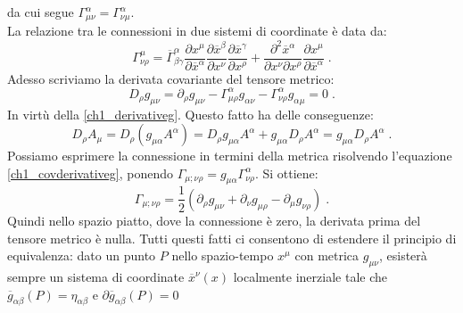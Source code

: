 \documentclass[12pt,a4paper]{report}
\theoremstyle{definition}
\begin{document}
da cui segue $\Gamma^{\alpha}_{\mu\nu}=\Gamma^{\alpha}_{\nu\mu}$. \\
La relazione tra le connessioni in due sistemi di coordinate è data da:
\begin{equation}
\Gamma^{\mu}_{\nu\rho}=\overline{\Gamma}^{\alpha}_{\beta\gamma}\frac{\partial x^{\mu}}{\partial\overline{x}^{\alpha}}\frac{\partial\overline{x}^{\beta}}{\partial x^{\nu}}\frac{\partial \overline{x}^{\gamma}}{\partial x^{\rho}}+\frac{\partial^2\overline{x}^{\alpha}}{\partial x^{\nu}\partial x^{\rho}}\frac{\partial x^{\mu}}{\partial \overline{x}^{\alpha}}\;.
\end{equation}
Adesso scriviamo la derivata covariante del tensore metrico:
\begin{equation}
D_{\rho}g_{\mu\nu}=\partial_{\rho}g_{\mu\nu}-\Gamma^{\alpha}_{\mu\rho}g_{\alpha\nu}-\Gamma^{\alpha}_{\nu\rho}g_{\alpha\mu}=0\;. \label{ch1_covderivativeg}
\end{equation}
In virtù della \eqref{ch1_derivativeg}. Questo fatto ha delle conseguenze:
$$
D_{\rho}A_{\mu}=D_{\rho}(g_{\mu\alpha}A^{\alpha})=D_{\rho}g_{\mu\alpha}A^{\alpha}+g_{\mu\alpha}D_{\rho}A^{\alpha}=g_{\mu\alpha}D_{\rho}A^{\alpha}\;.
$$
Possiamo esprimere la connessione in termini della metrica risolvendo l'equazione \eqref{ch1_covderivativeg}, ponendo $\Gamma_{\mu;\nu\rho}=g_{\mu\alpha}\Gamma^{\alpha}_{\nu\rho}$. Si ottiene:
\begin{equation}
\Gamma_{\mu;\nu\rho}=\frac{1}{2}(\partial_{\rho}g_{\mu\nu}+\partial_{\nu}g_{\mu\rho}-\partial_{\mu}g_{\nu\rho})\;.
\end{equation}
Quindi nello spazio piatto, dove la connessione è zero, la derivata prima del tensore metrico è nulla. Tutti questi fatti ci consentono di estendere il principio di equivalenza: dato un punto $P$ nello spazio-tempo $x^{\mu}$ con metrica $g_{\mu\nu}$, esisterà sempre un sistema di coordinate $\overline{x}^{\nu}(x)$ localmente inerziale tale che $\overline{g}_{\alpha\beta}(P)=\eta_{\alpha\beta}$ e $\partial \overline{g}_{\alpha\beta}(P)=0$
\end{document}
